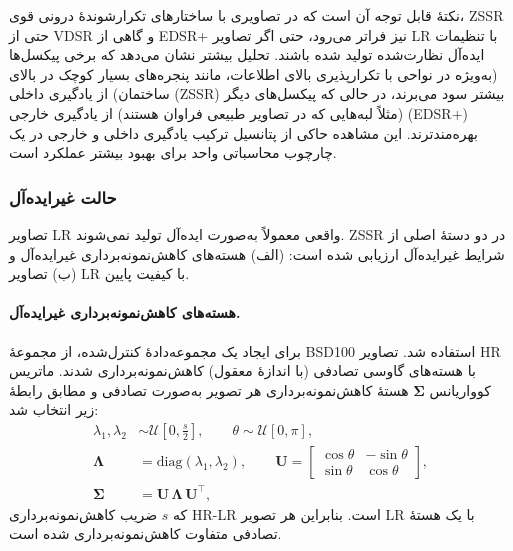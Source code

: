 نکتهٔ قابل توجه آن است که در تصاویری با ساختارهای تکرارشوندهٔ
درونی قوی، ZSSR حتی از VDSR و گاهی از EDSR+ نیز فراتر می‌رود،
حتی اگر تصاویر LR با تنظیمات ایده‌آل نظارت‌شده تولید شده باشند.
تحلیل بیشتر نشان می‌دهد که برخی پیکسل‌ها (به‌ویژه در نواحی با
تکرارپذیری بالای اطلاعات، مانند پنجره‌های بسیار کوچک در بالای
ساختمان) از یادگیری داخلی (ZSSR) بیشتر سود می‌برند، در حالی که
پیکسل‌های دیگر (مثلاً لبه‌هایی که در تصاویر طبیعی فراوان هستند)
از یادگیری خارجی (EDSR+) بهره‌مند‌ترند. این مشاهده حاکی از
پتانسیل ترکیب یادگیری داخلی و خارجی در یک چارچوب محاسباتی واحد
برای بهبود بیشتر عملکرد است.

\subsubsection{حالت غیرایده‌آل}

تصاویر LR واقعی معمولاً به‌صورت ایده‌آل تولید نمی‌شوند. ZSSR در دو
دستهٔ اصلی از شرایط غیرایده‌آل ارزیابی شده است:
(الف) هسته‌های کاهش‌نمونه‌برداری غیرایده‌آل و
(ب) تصاویر LR با کیفیت پایین.

\paragraph{هسته‌های کاهش‌نمونه‌برداری غیرایده‌آل.}
برای ایجاد یک مجموعه‌دادهٔ کنترل‌شده، از مجموعهٔ BSD100 \cite{martin2001bsd}
استفاده شد. تصاویر HR با هسته‌های گاوسی تصادفی (با اندازهٔ معقول)
کاهش‌نمونه‌برداری شدند. ماتریس کوواریانس $\boldsymbol{\Sigma}$ هستهٔ
کاهش‌نمونه‌برداری هر تصویر به‌صورت تصادفی و مطابق رابطهٔ زیر انتخاب شد:
\begin{align}
\lambda_1, \lambda_2 &\sim \mathcal{U}\!\left[0, \tfrac{s}{2}\right],
\qquad \theta \sim \mathcal{U}[0, \pi],
\nonumber\\[4pt]
\boldsymbol{\Lambda} &= \mathrm{diag}(\lambda_1, \lambda_2),
\qquad
\mathbf{U} =
\begin{bmatrix}
\cos\theta & -\sin\theta \\
\sin\theta & \cos\theta
\end{bmatrix},
\nonumber\\[4pt]
\boldsymbol{\Sigma} &= \mathbf{U}\,\boldsymbol{\Lambda}\,\mathbf{U}^{\!\top},
\label{eq:zssr_kernel}
\end{align}
که $s$ ضریب کاهش‌نمونه‌برداری HR-LR است. بنابراین هر تصویر LR با یک
هستهٔ تصادفی متفاوت کاهش‌نمونه‌برداری شده است.

